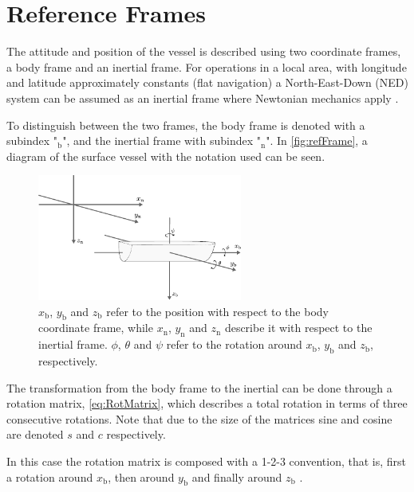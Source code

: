 \section{Reference Frames}\label{sec:frames}
The attitude and position of the vessel is described using two coordinate frames, a body frame and an inertial frame. For operations in a local area, with longitude and latitude approximately constants (flat navigation) a North-East-Down (NED) system can be assumed as an inertial frame where Newtonian mechanics apply \cite[p. 17]{TFossen}.

To distinguish between the two frames, the body frame is denoted with a subindex "$_\mathrm{b}$", and the inertial frame with subindex "$_\mathrm{n}$". In \autoref{fig:refFrame}, a diagram of the surface vessel with the notation used can be seen.
\begin{figure}[H]
    \includegraphics[width=0.6\textwidth]{figures/boat3D}
    \caption{$x_\mathrm{b}$, $y_\mathrm{b}$ and $z_\mathrm{b}$ refer to the position with respect to the body coordinate frame, while $x_\mathrm{n}$, $y_\mathrm{n}$ and $z_\mathrm{n}$ describe it with respect to the inertial frame. $\phi$, $\theta$ and $\psi$ refer to the rotation around $x_\mathrm{b}$, $y_\mathrm{b}$ and $z_\mathrm{b}$, respectively.}
    \label{fig:refFrame}
\end{figure}

The transformation from the body frame to the inertial can be done through a rotation matrix, \eqref{eq:RotMatrix}, which describes a total rotation in terms of three consecutive rotations. Note that due to the size of the matrices sine and cosine are denoted $s$ and $c$ respectively.

In this case the rotation matrix is composed with a 1-2-3 convention, that is, first a rotation around $x_{\mathrm{b}}$, then around $y_{\mathrm{b}}$ and finally around $z_{\mathrm{b}}$ \cite[p. 22]{TFossen}.

